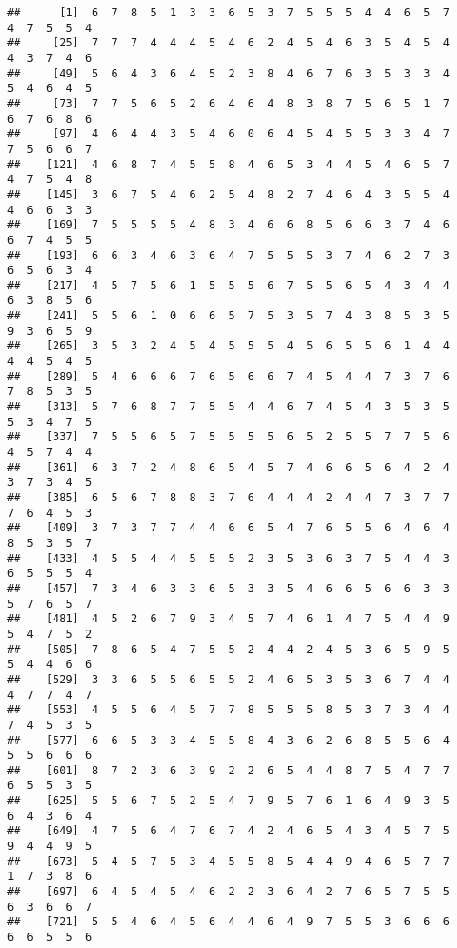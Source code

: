 \documentclass[
]{book}
\begin{document}
\begin{verbatim}
##      [1]  6  7  8  5  1  3  3  6  5  3  7  5  5  5  4  4  6  5  7  4  7  5  5  4
##     [25]  7  7  7  4  4  4  5  4  6  2  4  5  4  6  3  5  4  5  4  4  3  7  4  6
##     [49]  5  6  4  3  6  4  5  2  3  8  4  6  7  6  3  5  3  3  4  5  4  6  4  5
##     [73]  7  7  5  6  5  2  6  4  6  4  8  3  8  7  5  6  5  1  7  6  7  6  8  6
##     [97]  4  6  4  4  3  5  4  6  0  6  4  5  4  5  5  3  3  4  7  7  5  6  6  7
##    [121]  4  6  8  7  4  5  5  8  4  6  5  3  4  4  5  4  6  5  7  4  7  5  4  8
##    [145]  3  6  7  5  4  6  2  5  4  8  2  7  4  6  4  3  5  5  4  4  6  6  3  3
##    [169]  7  5  5  5  5  4  8  3  4  6  6  8  5  6  6  3  7  4  6  6  7  4  5  5
##    [193]  6  6  3  4  6  3  6  4  7  5  5  5  3  7  4  6  2  7  3  6  5  6  3  4
##    [217]  4  5  7  5  6  1  5  5  5  6  7  5  5  6  5  4  3  4  4  6  3  8  5  6
##    [241]  5  5  6  1  0  6  6  5  7  5  3  5  7  4  3  8  5  3  5  9  3  6  5  9
##    [265]  3  5  3  2  4  5  4  5  5  5  4  5  6  5  5  6  1  4  4  4  4  5  4  5
##    [289]  5  4  6  6  6  7  6  5  6  6  7  4  5  4  4  7  3  7  6  7  8  5  3  5
##    [313]  5  7  6  8  7  7  5  5  4  4  6  7  4  5  4  3  5  3  5  5  3  4  7  5
##    [337]  7  5  5  6  5  7  5  5  5  5  6  5  2  5  5  7  7  5  6  4  5  7  4  4
##    [361]  6  3  7  2  4  8  6  5  4  5  7  4  6  6  5  6  4  2  4  3  7  3  4  5
##    [385]  6  5  6  7  8  8  3  7  6  4  4  4  2  4  4  7  3  7  7  7  6  4  5  3
##    [409]  3  7  3  7  7  4  4  6  6  5  4  7  6  5  5  6  4  6  4  8  5  3  5  7
##    [433]  4  5  5  4  4  5  5  5  2  3  5  3  6  3  7  5  4  4  3  6  5  5  5  4
##    [457]  7  3  4  6  3  3  6  5  3  3  5  4  6  6  5  6  6  3  3  5  7  6  5  7
##    [481]  4  5  2  6  7  9  3  4  5  7  4  6  1  4  7  5  4  4  9  5  4  7  5  2
##    [505]  7  8  6  5  4  7  5  5  2  4  4  2  4  5  3  6  5  9  5  5  4  4  6  6
##    [529]  3  3  6  5  5  6  5  5  2  4  6  5  3  5  3  6  7  4  4  4  7  7  4  7
##    [553]  4  5  5  6  4  5  7  7  8  5  5  5  8  5  3  7  3  4  4  7  4  5  3  5
##    [577]  6  6  5  3  3  4  5  5  8  4  3  6  2  6  8  5  5  6  4  5  5  6  6  6
##    [601]  8  7  2  3  6  3  9  2  2  6  5  4  4  8  7  5  4  7  7  6  5  5  3  5
##    [625]  5  5  6  7  5  2  5  4  7  9  5  7  6  1  6  4  9  3  5  6  4  3  6  4
##    [649]  4  7  5  6  4  7  6  7  4  2  4  6  5  4  3  4  5  7  5  9  4  4  9  5
##    [673]  5  4  5  7  5  3  4  5  5  8  5  4  4  9  4  6  5  7  7  1  7  3  8  6
##    [697]  6  4  5  4  5  4  6  2  2  3  6  4  2  7  6  5  7  5  5  6  3  6  6  7
##    [721]  5  5  4  6  4  5  6  4  4  6  4  9  7  5  5  3  6  6  6  6  6  5  5  6

\end{verbatim}
\end{document}
